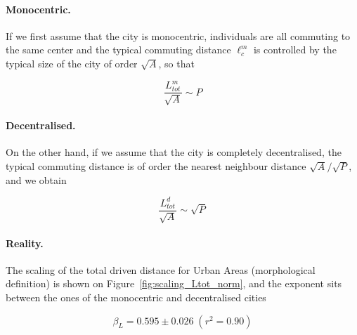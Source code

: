 \paragraph{Monocentric.} If we first assume that the city is monocentric, individuals are all commuting
to the same center and the typical commuting distance $\ell^m_c$ is controlled
by the typical size of the city of order $\sqrt{A}$, so that

\begin{equation} 
    \frac{L_{tot}^{m}}{\sqrt{A}} \sim P 
\end{equation}

\paragraph{Decentralised.} On the other hand, if we assume that the city is completely decentralised, the
typical commuting distance is of order the nearest neighbour distance
$\sqrt{A}/\sqrt{P}$, and we obtain

\begin{equation} 
    \frac{L_{tot}^{d}}{\sqrt{A}} \sim \sqrt{P} 
\end{equation}

\paragraph{Reality. } The scaling of the total driven distance for Urban Areas
(morphological definition) is shown on
Figure~\ref{fig:scaling_Ltot_norm}, and the exponent sits between the ones of the
monocentric and decentralised cities

\begin{equation*}
    \boxed{\beta_L =  0.595 \pm 0.026\; (r^2 = 0.90)}
\end{equation*}


